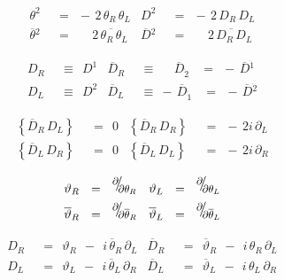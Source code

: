 \documentclass[14pt]{article}
\newcommand{\p}{\partial}
\newcommand{\ov}{\overline}
\begin{document}
\begin{align*}
	\theta^2    & ~~=~~    -\, 2\, \theta_R\, \theta_L 
	&
	D^2         & ~~=~~    -\, 2\, D_R\, D_L
	\\[2mm]
	\ov\theta{}^2    & ~~=~~    \phantom{+\,\ } 2\, \ov{\theta_R\, \theta}{}_L
	&
	\ov D{}^2              & ~~=~~    \phantom{+\,\ } 2\, \ov{D_R\, D}{}_L
\end{align*}

\begin{align*}
	D_R    & ~~\equiv~~    D^1
	&
	\ov D{}_R    & ~~\equiv~ \phantom{+\,\ } \ov D{}_{\dot 2} 
	~~
	~~=~~ -\, \ov{D}{}^{\dot 1}
	\\[2mm]
	D_L    & ~~\equiv~~    D^2
	&
	\ov D{}_L    & ~~\equiv~    -\, \ov D{}_{\dot 1}
	~~
	~~=~~ -\, \ov{D}{}^{\dot 2}
\end{align*}

\begin{align*}
	\left\{ \ov D{}_R\, D_L \right\}    & ~~=~~    0
	&
	\left\{ \ov D{}_R\, D_R \right\}    & ~~=~~    -\, 2 i\, \p_L
	\\
	\left\{ \ov D{}_L\, D_R \right\}    & ~~=~~    0
	&
	\left\{ \ov D{}_L\, D_L \right\}    & ~~=~~    -\, 2 i\, \p_R
\end{align*}

\newcommand{\deriv}[2]
{
  \raisebox{1.5ex}{\scalebox{0.86}{\ensuremath{#1}}}\hspace{-0.27em}\raisebox{1ex}{\scalebox{1.2}{/}} 
	\hspace{-0.36em}\scalebox{0.86}{\ensuremath{#2}}
}

\begin{align*}
	\vartheta_R    & ~~=~~    \deriv \p {\p \theta_R}
	&
	\vartheta_L    & ~~=~~    \deriv \p {\p \theta_L}
	\\
	\ov\vartheta{}_R    & ~~=~~    \deriv \p {\p \ov\theta{}_R}
	&
	\ov\vartheta{}_L    & ~~=~~    \deriv \p {\p \ov\theta{}_L}
\end{align*}

\begin{align*}
	D_R    & ~~=~~    \vartheta_R  ~~-~~  i\, \ov\theta{}_R\,\p_L
	&
	\ov D{}_R    & ~~=~~    \ov\vartheta{}_R  ~~-~~  i\, \theta_R\,\p_L
	\\[2mm]
	D_L    & ~~=~~    \vartheta_L  ~~-~~  i\, \ov\theta{}_L\,\p_R
	&
	\ov D{}_L    & ~~=~~    \ov\vartheta{}_L  ~~-~~  i\, \theta_L\,\p_R
\end{align*}
\end{document}
